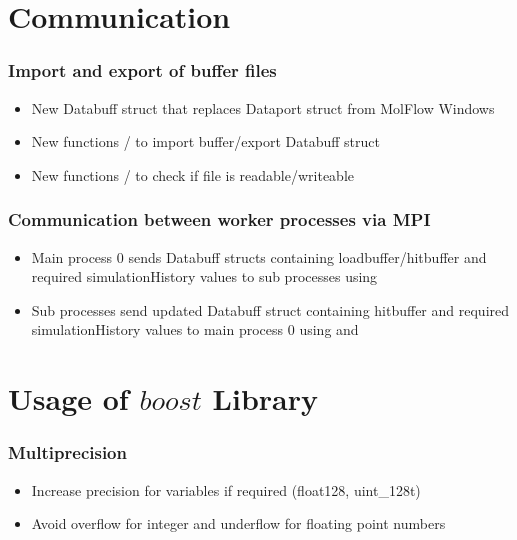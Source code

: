 \section{Communication}
\subsubsection{Import and export of buffer files}
\begin{itemize}[noitemsep,topsep=0pt, partopsep=0pt]
\item New Databuff struct that replaces Dataport struct from MolFlow Windows
\end{itemize}
\begin{itemize}[noitemsep,topsep=0pt, partopsep=0pt]
\item New functions / to import buffer/export Databuff struct
\item New functions / to check if file is readable/writeable
\end{itemize}

\subsubsection{Communication between worker processes via MPI}
\begin{itemize}[noitemsep,topsep=0pt, partopsep=0pt]
\item Main process 0 sends Databuff structs containing loadbuffer/hitbuffer and required simulationHistory values to sub processes using 
\item Sub processes send updated Databuff struct containing hitbuffer and required simulationHistory values to main process 0 using  and 
\end{itemize}

\section{Usage of $boost$ Library}
\subsubsection{Multiprecision}
\begin{itemize}[noitemsep,topsep=0pt, partopsep=0pt]
\item Increase precision for variables if required (float128, uint\_128t)
\item Avoid overflow for integer and underflow for floating point numbers
\end{itemize}
\newpage
